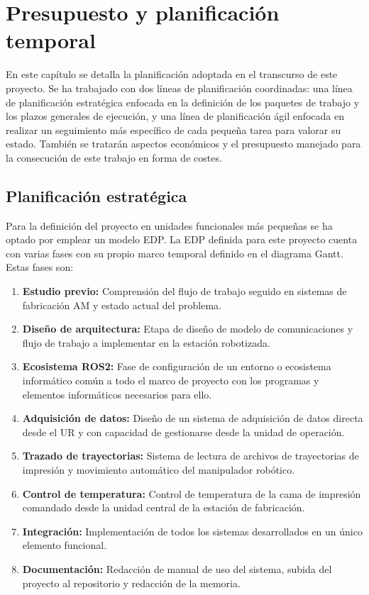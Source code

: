 \chapter{Presupuesto y planificación temporal}
\label{cap: planificacion_presupuesto}

En este capítulo se detalla la planificación adoptada en el transcurso de este proyecto. Se ha trabajado con dos líneas de planificación coordinadas: una línea de planificación estratégica enfocada en la definición de los paquetes de trabajo y los plazos generales de ejecución, y una línea de planificación ágil enfocada en realizar un seguimiento más específico de cada pequeña tarea para valorar su estado. También se tratarán aspectos económicos y el presupuesto manejado para la consecución de este trabajo en forma de costes.

\section{Planificación estratégica}
Para la definición del proyecto en unidades funcionales más pequeñas se ha optado por emplear un modelo \acrshort{EDP}. La \acrshort{EDP} definida para este proyecto cuenta con varias fases con  su propio marco temporal definido en el diagrama Gantt. Estas fases son:

\begin{enumerate}
    \item \textbf{Estudio previo:} Comprensión del flujo de trabajo seguido en sistemas de  fabricación \acrshort{AM} y estado actual del problema.
    \item \textbf{Diseño de arquitectura:} Etapa de diseño de modelo de comunicaciones y flujo de trabajo a implementar en la estación robotizada.
    \item \textbf{Ecosistema ROS2:} Fase de configuración de un entorno o ecosistema informático común a todo el marco de proyecto con los programas y elementos informáticos necesarios para ello.
    \item \textbf{Adquisición de datos:} Diseño de un sistema de adquisición de datos directa desde el UR y con capacidad de gestionarse desde la unidad de operación.
    \item \textbf{Trazado de trayectorias:} Sistema de lectura de archivos de trayectorias de impresión y movimiento automático del manipulador robótico.
    \item \textbf{Control de temperatura:} Control de temperatura de la cama de impresión comandado desde la unidad central de la estación de fabricación.
    \item \textbf{Integración:} Implementación de todos los sistemas desarrollados en un único elemento funcional.
    \item \textbf{Documentación:} Redacción de manual de uso del sistema, subida del proyecto al repositorio y redacción de la memoria.
\end{enumerate}


